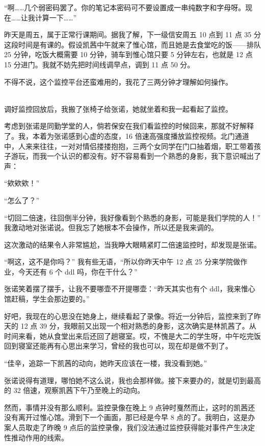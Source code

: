 \documentclass[UTF8]{ctexart}
\begin{document}
“啊……几个弱密码罢了。你的笔记本密码可不要设置成一串纯数字和字母呀。现在……让我计算一下……”

昨天是周五，属于正常行课期间。据我了解，下一级信安周五 10 点到 11 点 35 分这段时间是有课的。假设凯茜中午就来了惟心馆，而且她是去食堂吃的饭——排队 25 分钟，吃饭大概需要 10 分钟，骑车到惟心馆只要 5 分钟左右，也就是 12 点 15 分进门。我就不妨先把时间线调早点，调到 11 点 50 分。

不得不说，这个监控平台还蛮难用的，我花了三两分钟才理解如何操作。

~\\

调好监控回放后，我搬了张椅子给张诺，她就坐着和我一起看起了监控。

考虑到张诺是同勤学堂的人，倘若保安在我们看监控的时候回来，那就不好解释了。我，本着为张诺感到心虚的态度，16 倍速高强度播放监控视频。北门通道中，人来来往往，一对对情侣搂搂抱抱，三两个女同学在门口抽着烟，职工带着孩子游玩，而我一个认识的都没有。好不容易看到一个熟悉的身影，我下意识喊出了声：

“欸欸欸！”

“怎么了？”

“切回二倍速，往回倒半分钟，我好像看到个熟悉的身影，可能是我们学院的人！” 我激动地对张诺说。但我忘了她根本不会操作，所以还是我来调的。

这次激动的结果令人非常尴尬，当我睁大眼睛紧盯二倍速监控时，却发现是张诺。

“啊这，这不是你吗？” 我有些无语，“所以你昨天中午 12 点 25 分来学院做作业，今天还有 6 个 ddl 吗，你在干什么？”

张诺笑着摆了摆手，让我不要哪壶不开提哪壶：“昨天其实也有个 ddl，我来惟心馆赶稿，学生会那边要的。”

好吧，我现在的心思没在她身上，继续看起了录像。将近一分钟后，监控来到了昨天的 12 点 39 分，我眼前又出现一个相对熟悉的身影，这次确实是林凯茜了。从时间来看，她从食堂出来后还回了趟寝室。哎，不愧是大二的学生呀，中午吃完饭回到寝室还能再有心思出来学习，曾经的我也可以，现在却是做不到了。

“佳辛，追踪一下凯茜的动向，她昨天应该在一楼，我没看到她。”

张诺说得有道理，哪怕她不这么说，我也会那样做。接下来要办的，就是切到最高的 32 倍速，观察凯茜下午乃至晚上的动向。

然而，事情并没有那么顺利。监控录像在晚上 9 点钟时戛然而止，这时的凯茜还没有离开过惟心馆。滑到下一个画面，那已经是今早 8 点的了。我明白，这是办案人员取走了昨晚 9 点后的监控录像，我们没法通过监控获得能对事件产生决定性推动作用的线索。
\end{document}
